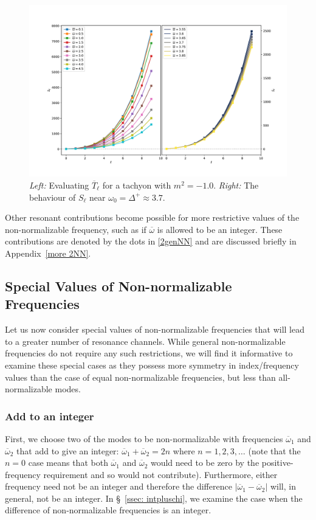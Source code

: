 \documentclass[letterpaper,11pt]{article}
\newcommand{\oone}{\overline{\omega}_1}
\newcommand{\otwo}{\overline{\omega}_2}
\newcommand{\ob}{\overline{\omega}}
\begin{document}
\begin{figure}[h]
\centering
\includegraphics[width=\textwidth]{./figures/NN_equalfreq_sourceterms_m-1_0+zoom}
\caption{{\it Left:} Evaluating $\overline{T}_{\ell}$ for a tachyon with $m^2 = -1.0$. {\it Right:} The behaviour of $S_\ell$ near $\omega_0 = \Delta^+ \approx  3.7$.}
\label{fig:equal_frequency_m-1_0}
\end{figure}

Other resonant contributions become possible for more restrictive values of the non-normalizable frequency, such as if $\ob$ is allowed to be an integer. These contributions are denoted by the dots in \eqref{2genNN} and are discussed briefly in Appendix~\ref{more 2NN}.

\subsection{Special Values of Non-normalizable Frequencies}

Let us now consider special values of non-normalizable frequencies that will lead to a greater number of resonance channels. While general non-normalizable frequencies do not require any such restrictions, we will find it informative to examine these special cases as they possess more symmetry in index/frequency values than the case of equal non-normalizable frequencies, but less than all-normalizable modes. 

\subsubsection{Add to an integer}
\label{ssec: add to integer}

First, we choose two of the modes to be non-normalizable with frequencies $\oone$ and $\otwo$ that add to give an integer: $\oone+ \otwo = 2n$ where $n = 1, 2, 3, \ldots$ (note that the $n = 0$ case means that both $\oone$ and $\otwo$ would need to be zero by the positive-frequency requirement and so would not contribute). Furthermore, either frequency need not be an integer and therefore the difference $|\oone - \otwo|$ will, in general, not be an integer. In \S\!~\ref{ssec: intpluschi}, we examine the case when the difference of non-normalizable frequencies is an integer.
\end{document}
